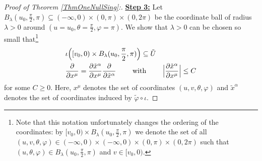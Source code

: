 \documentclass[reqno]{article}
\begin{document}
\begin{proof}[Proof of Theorem \ref{ThmOneNullSing}:]
\underline{\textbf{Step 3:}}  Let $B_\lambda (u_0, \frac{\pi}{2}, \pi) \subseteq (-\infty, 0) \times (0, \pi) \times (0, 2\pi)$ be the coordinate ball of radius $\lambda >0$ around $(u = u_0, \theta = \frac{\pi}{2}, \varphi = \pi)$. We show that $\lambda >0$ can be chosen so small that\footnote{Note that this notation unfortunately changes the ordering of the coordinates: by $[v_0, 0) \times B_\lambda(u_0, \frac{\pi}{2}, \pi)$ we denote the set of all $(u,v, \theta, \varphi) \in (-\infty, 0) \times (-\infty, 0) \times (0, \pi) \times (0, 2\pi)$ such that $(u, \theta, \varphi) \in B_\lambda (u_0, \frac{\pi}{2}, \pi)$ and $v \in [v_0, 0)$.}
\begin{equation*}
\begin{split}
&\iota \Big([v_0, 0) \times B_\lambda(u_0, \frac{\pi}{2}, \pi)\Big) \subseteq \tilde{U} \\
& \frac{\partial}{\partial x^\mu} = \frac{\partial \tilde{x}^\alpha}{\partial x^\mu} \frac{\partial}{\partial \tilde{x}^\alpha} \qquad \textnormal{ with } \qquad \Big{|}\frac{\partial \tilde{x}^\alpha}{\partial x^\mu}\Big{|} \leq C
\end{split}
\end{equation*}
for some $C \geq 0$. Here, $x^\mu$ denotes the set of coordinates $(u,v, \theta, \varphi)$ and $\tilde{x}^\alpha$ denotes the set of coordinates induced by $\tilde{\varphi} \circ \iota$.
\newline


\end{proof}
\end{document}
